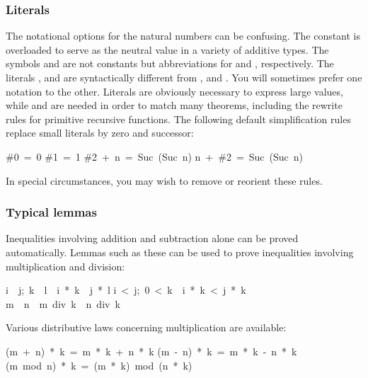 \subsubsection{Literals}
The notational options for the natural numbers can be confusing. The 
constant  is overloaded to serve as the neutral value 
in a variety of additive types. The symbols  and  are 
not constants but abbreviations for  and ,
respectively. The literals ,  and   are
syntactically different from ,  and . You  will
sometimes prefer one notation to the other. Literals are  obviously
necessary to express large values, while  and   are needed
in order to match many theorems, including the rewrite  rules for primitive
recursive functions. The following default  simplification rules replace
small literals by zero and successor: 
\begin{isabelle}
\#0\ =\ 0
\isanewline
\#1\ =\ 1
\isanewline
\#2\ +\ n\ =\ Suc\ (Suc\ n)
\isanewline
n\ +\ \#2\ =\ Suc\ (Suc\ n)
\end{isabelle}
In special circumstances, you may wish to remove or reorient 
these rules. 

\subsubsection{Typical lemmas}
Inequalities involving addition and subtraction alone can be proved
automatically.  Lemmas such as these can be used to prove inequalities
involving multiplication and division:
\begin{isabelle}
\isasymlbrakk i\ \isasymle \ j;\ k\ \isasymle \ l\isasymrbrakk \ \isasymLongrightarrow \ i\ *\ k\ \isasymle \ j\ *\ l%
\isanewline
\isasymlbrakk i\ <\ j;\ 0\ <\ k\isasymrbrakk \ \isasymLongrightarrow \ i\
*\ k\ <\ j\ *\ k%
\isanewline
m\ \isasymle \ n\ \isasymLongrightarrow \ m\ div\ k\ \isasymle \ n\ div\ k%
\rulename{div_le_mono}
\end{isabelle}
%
Various distributive laws concerning multiplication are available:
\begin{isabelle}
(m\ +\ n)\ *\ k\ =\ m\ *\ k\ +\ n\ *\ k%
\isanewline
(m\ -\ n)\ *\ k\ =\ m\ *\ k\ -\ n\ *\ k%
\isanewline
(m\ mod\ n)\ *\ k\ =\ (m\ *\ k)\ mod\ (n\ *\ k)
\end{isabelle}

